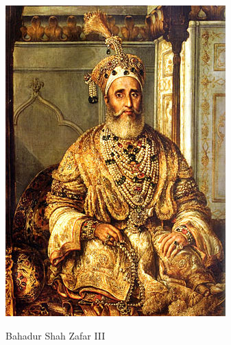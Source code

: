 \begin{marginfigure}[-5.5in]
    \includegraphics[width=0.75\marginparwidth]{./pictures/Bahadur_Shah_II.jpg}
    \caption{Bahadur Shah Zafar III}
    \label{BSZ_II}
\end{marginfigure}


